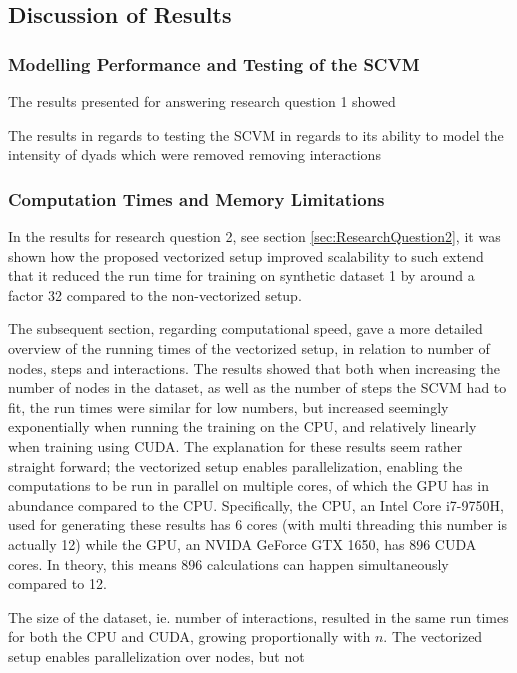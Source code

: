 \subsection{Discussion of Results}
\label{sec:Discussion:Results}


\subsubsection{Modelling Performance and Testing of the SCVM}
\label{sec:Discussion:Results:ModellingPerformance}

The results presented for answering research question 1 showed 

The results in regards to testing the SCVM in regards to its ability to model the intensity of dyads which were removed  
removing interactions


\subsubsection{Computation Times and Memory Limitations}
\label{sec:Discussion:Results:ComputationSpeed}
In the results for research question 2, see section \ref{sec:ResearchQuestion2}, it was shown how the proposed vectorized setup improved scalability to such extend that it reduced the run time for training on synthetic dataset 1 by around a factor 32 compared to the non-vectorized setup.

The subsequent section, regarding computational speed, gave a more detailed overview of the running times of the vectorized setup, in relation to number of nodes, steps and interactions.
The results showed that both when increasing the number of nodes in the dataset, as well as the number of steps the SCVM had to fit, the run times were similar for low numbers, but increased seemingly exponentially when running the training on the CPU, and relatively linearly when training using CUDA.
The explanation for these results seem rather straight forward; the vectorized setup enables parallelization, enabling the computations to be run in parallel on multiple cores, of which the GPU has in abundance compared to the CPU. 
Specifically, the CPU, an Intel Core i7-9750H, used for generating these results has 6 cores (with multi threading this number is actually 12) while the GPU, an NVIDA GeForce GTX 1650, has 896 CUDA cores.
In theory, this means 896 calculations can happen simultaneously compared to 12.

The size of the dataset, ie. number of interactions, resulted in the same run times for both the CPU and CUDA, growing proportionally with $n$.
The vectorized setup enables parallelization over nodes, but not 


